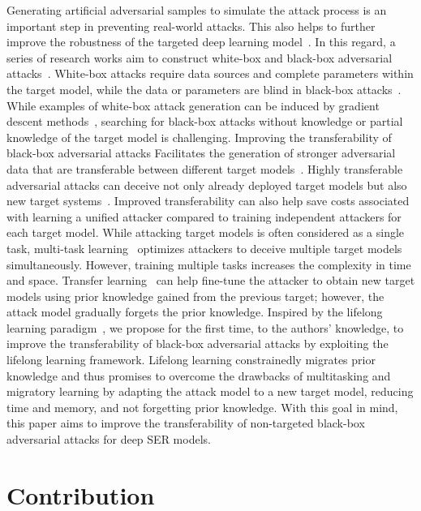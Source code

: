 Generating artificial adversarial samples to simulate the attack process is an important step in preventing real-world attacks. This also helps to further improve the robustness of the targeted deep learning model~\cite{samangouei2018defense}. In this regard, a series of research works aim to construct white-box and black-box adversarial attacks~\cite{ren2020enhancing,madry2017towards}. White-box attacks require data sources and
complete parameters within the target model, while the data or parameters are blind in black-box attacks~\cite{madry2017towards}. While examples of white-box attack generation can be induced by gradient descent methods~\cite{ren2020enhancing}, searching for black-box attacks without knowledge or partial knowledge of the target model is challenging. Improving the transferability of black-box adversarial attacks
Facilitates the generation of stronger adversarial data that are transferable between different target models~\cite{liu2017delving}. Highly transferable adversarial attacks can deceive not only already deployed target models but also new target systems~\cite{wu2018understanding}.
Improved transferability can also help save costs associated with learning a unified attacker compared to training independent attackers for each target model. While attacking target models is often considered as a single task, multi-task learning~\cite{zhao2018data,zhang2019attention} optimizes attackers to deceive multiple target models simultaneously. However, training multiple tasks increases the complexity in time and space. Transfer learning~\cite{wang2018great} can help fine-tune the attacker to obtain new target models using prior knowledge gained from the previous target; however, the attack model gradually forgets the prior knowledge. Inspired by the lifelong learning paradigm~\cite{parisi2019continual}, we propose for the first time, to the authors' knowledge, to improve the transferability of black-box adversarial attacks by exploiting the lifelong learning framework.
Lifelong learning constrainedly migrates prior knowledge and thus promises to overcome the drawbacks of multitasking and migratory learning by adapting the attack model to a new target model, reducing time and memory, and not forgetting prior knowledge. With this goal in mind, this paper aims to improve the transferability of non-targeted black-box adversarial attacks for deep SER models.
 
\section{Contribution}

